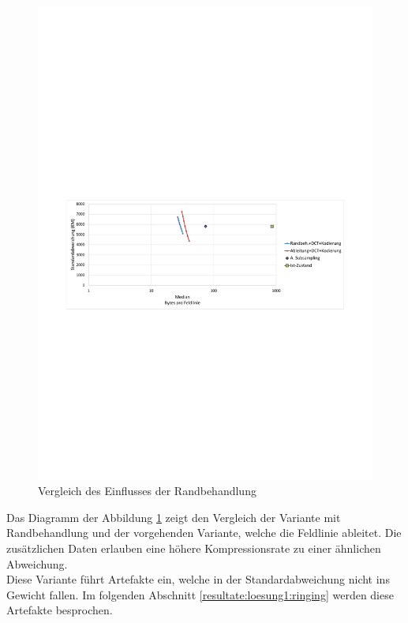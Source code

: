 \begin{figure}[!htbp]
	\center	\includegraphics[trim = 1.8cm 11.25cm 1.8cm 12.75cm, clip=true,width=1\textwidth,keepaspectratio]{./pictures/resultate/loesung1/loesung1-7/loesung1_7.pdf}
	\caption{Vergleich des Einflusses der Randbehandlung}
	\label{resultate:loesung1:dct:randbehandlung}
\end{figure}
Das Diagramm der Abbildung \ref{resultate:loesung1:dct:randbehandlung} zeigt den Vergleich der Variante mit Randbehandlung und der vorgehenden Variante, welche die Feldlinie ableitet. Die zusätzlichen Daten erlauben eine höhere Kompressionsrate zu einer ähnlichen Abweichung.\\
Diese Variante führt Artefakte ein, welche in der Standardabweichung nicht ins Gewicht fallen. Im folgenden Abschnitt \ref{resultate:loesung1:ringing} werden diese Artefakte besprochen.

